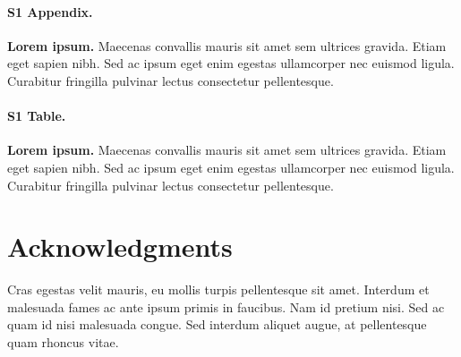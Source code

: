 \documentclass[10pt,letterpaper]{article}
\begin{document}
\paragraph*{S1 Appendix.}
\label{S1_Appendix}
{\bf Lorem ipsum.} Maecenas convallis mauris sit amet sem ultrices gravida. Etiam eget sapien nibh. Sed ac ipsum eget enim egestas ullamcorper nec euismod ligula. Curabitur fringilla pulvinar lectus consectetur pellentesque.

\paragraph*{S1 Table.}
\label{S1_Table}
{\bf Lorem ipsum.} Maecenas convallis mauris sit amet sem ultrices gravida. Etiam eget sapien nibh. Sed ac ipsum eget enim egestas ullamcorper nec euismod ligula. Curabitur fringilla pulvinar lectus consectetur pellentesque.

\section*{Acknowledgments}
Cras egestas velit mauris, eu mollis turpis pellentesque sit amet. Interdum et malesuada fames ac ante ipsum primis in faucibus. Nam id pretium nisi. Sed ac quam id nisi malesuada congue. Sed interdum aliquet augue, at pellentesque quam rhoncus vitae.

\nolinenumbers
\end{document}
